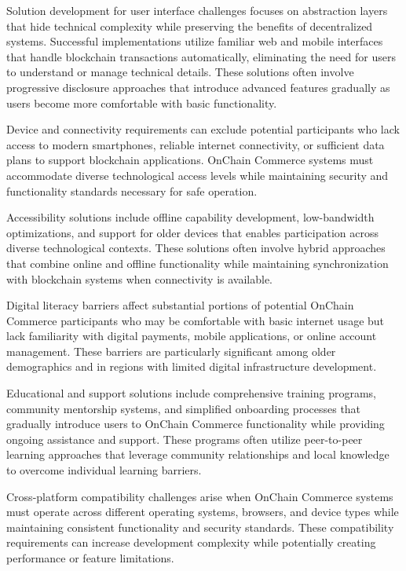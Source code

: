 \documentclass[
  Letterpaper,
]{scrbook}
\begin{document}
Solution development for user interface challenges focuses on
abstraction layers that hide technical complexity while preserving the
benefits of decentralized systems. Successful implementations utilize
familiar web and mobile interfaces that handle blockchain transactions
automatically, eliminating the need for users to understand or manage
technical details. These solutions often involve progressive disclosure
approaches that introduce advanced features gradually as users become
more comfortable with basic functionality.

Device and connectivity requirements can exclude potential participants
who lack access to modern smartphones, reliable internet connectivity,
or sufficient data plans to support blockchain applications. OnChain
Commerce systems must accommodate diverse technological access levels
while maintaining security and functionality standards necessary for
safe operation.

Accessibility solutions include offline capability development,
low-bandwidth optimizations, and support for older devices that enables
participation across diverse technological contexts. These solutions
often involve hybrid approaches that combine online and offline
functionality while maintaining synchronization with blockchain systems
when connectivity is available.

Digital literacy barriers affect substantial portions of potential
OnChain Commerce participants who may be comfortable with basic internet
usage but lack familiarity with digital payments, mobile applications,
or online account management. These barriers are particularly
significant among older demographics and in regions with limited digital
infrastructure development.

Educational and support solutions include comprehensive training
programs, community mentorship systems, and simplified onboarding
processes that gradually introduce users to OnChain Commerce
functionality while providing ongoing assistance and support. These
programs often utilize peer-to-peer learning approaches that leverage
community relationships and local knowledge to overcome individual
learning barriers.

Cross-platform compatibility challenges arise when OnChain Commerce
systems must operate across different operating systems, browsers, and
device types while maintaining consistent functionality and security
standards. These compatibility requirements can increase development
complexity while potentially creating performance or feature
limitations.
\end{document}
